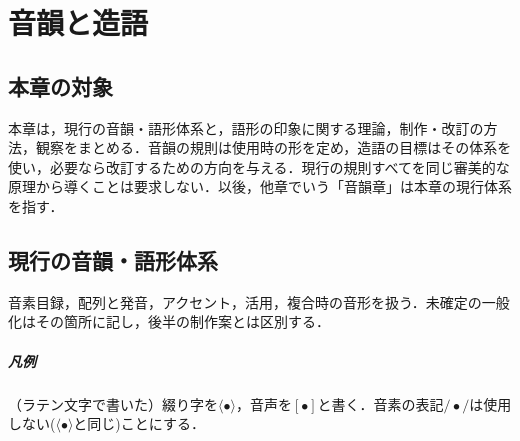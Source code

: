 \documentclass[../../main-detail.tex]{subfiles}
\begin{document}
\chapter{音韻と造語}
\section{本章の対象}
本章は，現行の音韻・語形体系と，語形の印象に関する理論，制作・改訂の方法，観察をまとめる．音韻の規則は使用時の形を定め，造語の目標はその体系を使い，必要なら改訂するための方向を与える．現行の規則すべてを同じ審美的な原理から導くことは要求しない．以後，他章でいう「音韻章」は本章の現行体系を指す．

\section{現行の音韻・語形体系}
音素目録，配列と発音，アクセント，活用，複合時の音形を扱う．未確定の一般化はその箇所に記し，後半の制作案とは区別する．
\paragraph{凡例}（ラテン文字で書いた）綴り字を$\langle \bullet\rangle$，音声を$[\bullet]$と書く．音素の表記$/\!\bullet\!/$は使用しない($\langle \bullet\rangle$と同じ)ことにする．
\end{document}
